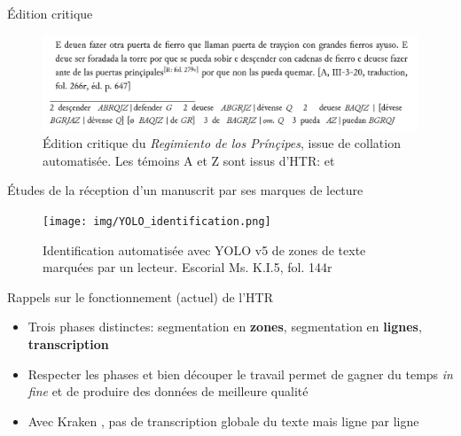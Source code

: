 \documentclass[11pt,aspectratio=169]{beamer}
\let\cite\parencite
\begin{document}
\begin{frame}{Édition critique}
\begin{figure}
\includegraphics[width=1\textwidth]{img/base_a.png}
\caption{Édition critique du \textit{Regimiento de los Prínçipes}, issue de collation automatisée. Les témoins A et Z sont issus d'HTR: \cite{gillelevenson_RegimientoPrincipesSa_2023} et \cite{gillelevenson_GeneralOpenDataset_2023}}
\end{figure}
\end{frame}


\begin{frame}{Études de la réception d'un manuscrit par ses marques de lecture}
\begin{figure}
\texttt{[image: img/YOLO\_identification.png]}
\caption{Identification automatisée  avec YOLO v5 \cite{redmon_YouOnlyLook_2016a} de zones de texte marquées par un lecteur. Escorial Ms. K.I.5, fol. 144r}
\end{figure}
\end{frame}


\begin{frame}{Rappels sur le fonctionnement (actuel) de l'HTR}

\begin{itemize}
\item Trois phases distinctes: segmentation en \textbf{zones}, segmentation en \textbf{lignes}, \textbf{transcription}
\pause\item Respecter les phases et bien découper le travail permet de gagner du temps \textit{in fine} et de produire des données de meilleure qualité
\pause\item Avec Kraken \cite{kiessling_KrakenUniversalText_2019}, pas de transcription globale du texte mais ligne par ligne
\end{itemize}
\end{frame}
\end{document}
